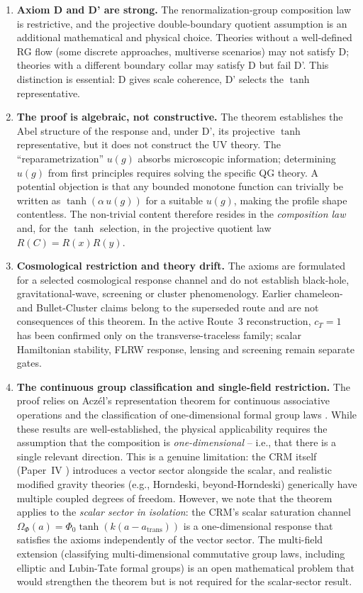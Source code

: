 \documentclass[aps,prd,twocolumn,superscriptaddress,nofootinbib]{revtex4-2}
\begin{document}
\begin{enumerate}
\item \textbf{Axiom D and D' are strong.} The renormalization-group composition law is restrictive, and the projective double-boundary quotient assumption is an additional mathematical and physical choice. Theories without a well-defined RG flow (some discrete approaches, multiverse scenarios) may not satisfy D; theories with a different boundary collar may satisfy D but fail D'. This distinction is essential: D gives scale coherence, D' selects the $\tanh$ representative.

\item \textbf{The proof is algebraic, not constructive.} The theorem establishes the Abel structure of the response and, under D', its projective $\tanh$ representative, but it does not construct the UV theory. The ``reparametrization'' $u(g)$ absorbs microscopic information; determining $u(g)$ from first principles requires solving the specific QG theory. A potential objection is that any bounded monotone function can trivially be written as $\tanh(\alpha\,u(g))$ for a suitable $u(g)$, making the profile shape contentless. The non-trivial content therefore resides in the \textit{composition law} and, for the $\tanh$ selection, in the projective quotient law $R(C)=R(x)R(y)$.

\item \textbf{Cosmological restriction and theory drift.} The axioms are formulated for a selected cosmological response channel and do not establish black-hole, gravitational-wave, screening or cluster phenomenology. Earlier chameleon- and Bullet-Cluster claims belong to the superseded route and are not consequences of this theorem. In the active Route~3 reconstruction, $c_T=1$ has been confirmed only on the transverse-traceless family; scalar Hamiltonian stability, FLRW response, lensing and screening remain separate gates.

\item \textbf{The continuous group classification and single-field restriction.} The proof relies on Acz\'el's representation theorem for continuous associative operations \cite{Aczel1966} and the classification of one-dimensional formal group laws \cite{Hazewinkel1978}. While these results are well-established, the physical applicability requires the assumption that the composition is \textit{one-dimensional} -- i.e., that there is a single relevant direction. This is a genuine limitation: the CRM itself (Paper~IV \cite{Geiger2026d}) introduces a vector sector alongside the scalar, and realistic modified gravity theories (e.g., Horndeski, beyond-Horndeski) generically have multiple coupled degrees of freedom. However, we note that the theorem applies to the \textit{scalar sector in isolation}: the CRM's scalar saturation channel $\Omega_\Phi(a) = \Phi_0 \tanh(k(a - a_{\mathrm{trans}}))$ is a one-dimensional response that satisfies the axioms independently of the vector sector. The multi-field extension (classifying multi-dimensional commutative group laws, including elliptic and Lubin-Tate formal groups) is an open mathematical problem that would strengthen the theorem but is not required for the scalar-sector result.


\end{enumerate}
\end{document}
